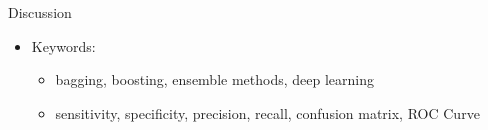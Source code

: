 \begin{frame}{\vskip -0.2cm \normalsize Discussion}
\begin{itemize}
\item
	Keywords:
	\begin{itemize}\tiny
	\item
		bagging, boosting, ensemble methods, deep learning
	\item
		sensitivity, specificity, precision, recall, confusion matrix, ROC Curve
	\end{itemize}

\end{itemize}

\end{frame}
\normalsize

